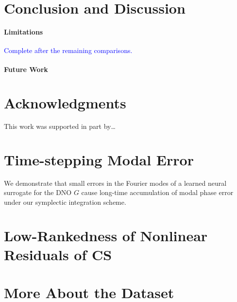\documentclass{article}
\begin{document}
\clearpage
\section{Conclusion and Discussion}
\paragraph{Limitations}
\textcolor{blue}{Complete after the remaining comparisons.}
\paragraph{Future Work}

\section*{Acknowledgments}
This work was supported in part by\ldots


\appendix
\section{Time-stepping Modal Error}
We demonstrate that small errors in the Fourier modes of a learned neural
surrogate for the DNO $G$ cause long-time accumulation of modal phase error
under our symplectic integration scheme.
\section{Low-Rankedness of Nonlinear Residuals of CS}
\section{More About the Dataset}
\end{document}
